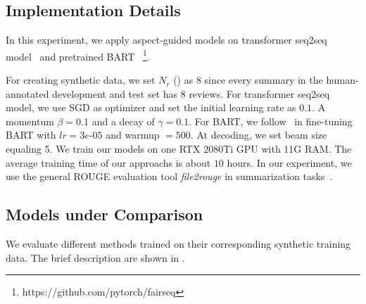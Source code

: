 \subsection{Implementation Details}
In this experiment,
we apply aspect-guided models on transformer seq2seq model~\cite{Transformer17}
and pretrained BART~\cite{BART20}
\footnote{https://github.com/pytorch/fairseq}.

For creating synthetic data, 
we set $N_r$ () as $8$ 
since every summary in the human-annotated development and test set has $8$ reviews.
For transformer seq2seq model, we use SGD as optimizer and set the initial learning rate as $0.1$.
A momentum $\beta=0.1$ and a decay of  $\gamma=0.1$.
For BART,
we follow~\citet{BART20} in fine-tuning BART with
$lr=3e$-$05$ and warmup $=500$.
At decoding, we set beam size equaling 5.
We train our models on one RTX 2080Ti GPU with 11G RAM. 
The average training time of our approachs is about $10$ hours.
In our experiment, we use the general ROUGE evaluation tool {\em file2rouge} in summarization tasks~\cite{BART20,DialogMV2020}.


\subsection{Models under Comparison}

We evaluate different methods trained on their corresponding synthetic training data.
The brief description are shown in .

